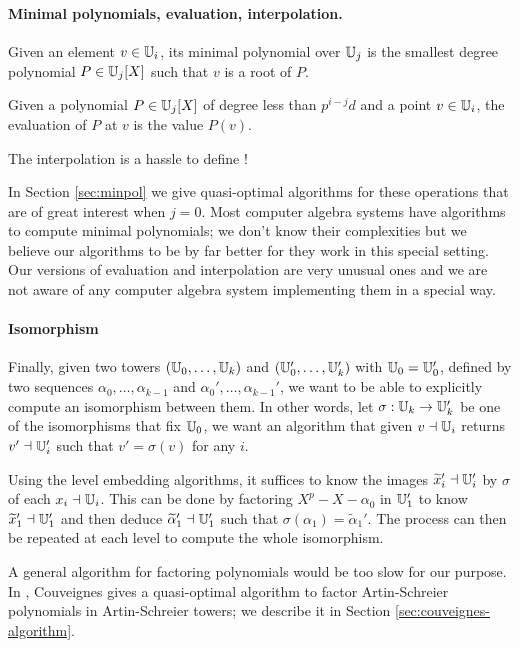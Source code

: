 \paragraph{Minimal polynomials, evaluation, interpolation.}
Given an element $v\in\mathbb{U}_i$, its minimal polynomial over $\mathbb{U}_j$ is
the smallest degree polynomial $P\in\mathbb{U}_j[X]$ such that $v$ is a root
of $P$.

Given a polynomial $P\in\mathbb{U}_j[X]$ of degree less than $p^{i-j}d$ and a
point $v\in\mathbb{U}_i$, the evaluation of $P$ at $v$ is the value $P(v)$.

The interpolation is a hassle to define !

In Section \ref{sec:minpol} we give quasi-optimal algorithms for these
operations that are of great interest when $j=0$. Most computer
algebra systems have algorithms to compute minimal polynomials; we
don't know their complexities but we believe our algorithms to be by
far better for they work in this special setting. Our versions of
evaluation and interpolation are very unusual ones and we are not
aware of any computer algebra system implementing them in a special
way.


\paragraph{Isomorphism}
Finally, given two towers $(\mathbb{U}_0,\ldots,\mathbb{U}_k)$ and
$(\mathbb{U}_0',\ldots,\mathbb{U}_k')$ with $\mathbb{U}_0=\mathbb{U}_0'$, defined by two sequences
$\alpha_0,\ldots,\alpha_{k-1}$ and $\alpha_0',\ldots,\alpha_{k-1}'$,
we want to be able to explicitly compute an isomorphism between
them. In other words, let $\sigma : \mathbb{U}_k\rightarrow\mathbb{U}_k'$ be one of
the isomorphisms that fix $\mathbb{U}_0$, we want an algorithm that given
$v\dashv\mathbb{U}_i$ returns $v'\dashv\mathbb{U}_i'$ such that $v'=\sigma(v)$ for any
$i$.

Using the level embedding algorithms, it suffices to know the images
$\widetilde{x}_i'\dashv\mathbb{U}_i'$ by $\sigma$ of each $x_i\dashv\mathbb{U}_i$. This can be
done by factoring $X^p - X - \alpha_0$ in $\mathbb{U}_1'$ to know
$\widetilde{x}_1'\dashv\mathbb{U}_1'$ and then deduce $\widetilde{\alpha}_1'\dashv\mathbb{U}_1'$
such that $\sigma(\alpha_1) = \widetilde{\alpha}_1'$. The process can then be
repeated at each level to compute the whole isomorphism.

A general algorithm for factoring polynomials would be too slow for
our purpose. In \cite{}, Couveignes gives a quasi-optimal algorithm to
factor Artin-Schreier polynomials in Artin-Schreier towers; we
describe it in Section \ref{sec:couveignes-algorithm}.

